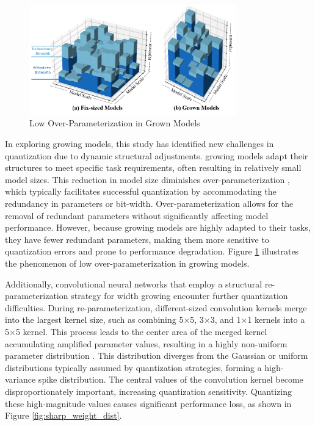 \documentclass[preprint,12pt]{elsarticle}
\begin{document}
\begin{figure}[ht]
\centering
\includegraphics[width=0.8\textwidth]{imgs/bits.png}
\caption{Low Over-Parameterization in Grown Models}
\label{fig:low_overparam}
\end{figure}

In exploring growing models, this study has identified new challenges in quantization due to dynamic structural adjustments. growing models adapt their structures to meet specific task requirements, often resulting in relatively small model sizes. This reduction in model size diminishes over-parameterization \cite{over}, which typically facilitates successful quantization by accommodating the redundancy in parameters or bit-width. Over-parameterization allows for the removal of redundant parameters without significantly affecting model performance. However, because growing models are highly adapted to their tasks, they have fewer redundant parameters, making them more sensitive to quantization errors and prone to performance degradation. Figure \ref{fig:low_overparam} illustrates the phenomenon of low over-parameterization in growing models.

Additionally, convolutional neural networks that employ a structural re-parameterization strategy for width growing encounter further quantization difficulties. During re-parameterization, different-sized convolution kernels merge into the largest kernel size, such as combining 5×5, 3×3, and 1×1 kernels into a 5×5 kernel. This process leads to the center area of the merged kernel accumulating amplified parameter values, resulting in a highly non-uniform parameter distribution \cite{repopt}. This distribution diverges from the Gaussian or uniform distributions typically assumed by quantization strategies, forming a high-variance spike distribution. The central values of the convolution kernel become disproportionately important, increasing quantization sensitivity. Quantizing these high-magnitude values causes significant performance loss, as shown in Figure \ref{fig:sharp_weight_dist}.
\end{document}

